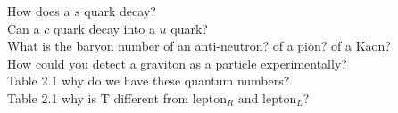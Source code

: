 \documentclass[a4paper,10pt,twoside,notitlepage]{article}
\begin{document}
\begin{description}
\item[How does a $s$ quark decay?]

\item[Can a $c$ quark decay into a $u$ quark?]

\item[What is the baryon number of an anti-neutron? of a pion? of a Kaon?]

\item[How could you detect a graviton as a particle experimentally?]

\item[Table 2.1 why do we have these quantum numbers?]

\item[Table 2.1 why is T different from lepton$_R$ and lepton$_L$?]
\end{description}
\end{document}
